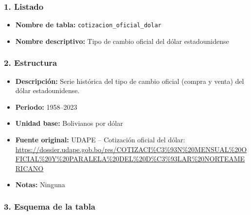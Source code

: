\documentclass[12pt,a4paper]{article}
\begin{document}
\subsubsection*{1. Listado}
\begin{itemize}
  \item \textbf{Nombre de tabla:} \texttt{cotizacion\_oficial\_dolar}
  \item \textbf{Nombre descriptivo:} Tipo de cambio oficial del dólar estadounidense
\end{itemize}

\subsubsection*{2. Estructura}
\begin{itemize}
  \item \textbf{Descripción:} Serie histórica del tipo de cambio oficial (compra y venta) del dólar estadounidense.
  \item \textbf{Periodo:} 1958–2023
  \item \textbf{Unidad base:} Bolivianos por dólar
  \item \textbf{Fuente original:} UDAPE – Cotización oficial del dólar:\\
    \url{https://dossier.udape.gob.bo/res/COTIZACI%C3%93N%20MENSUAL%20OFICIAL%20Y%20PARALELA%20DEL%20D%C3%93LAR%20NORTEAMERICANO}
  \item \textbf{Notas:} Ninguna
\end{itemize}

\subsubsection*{3. Esquema de la tabla}
\end{document}
